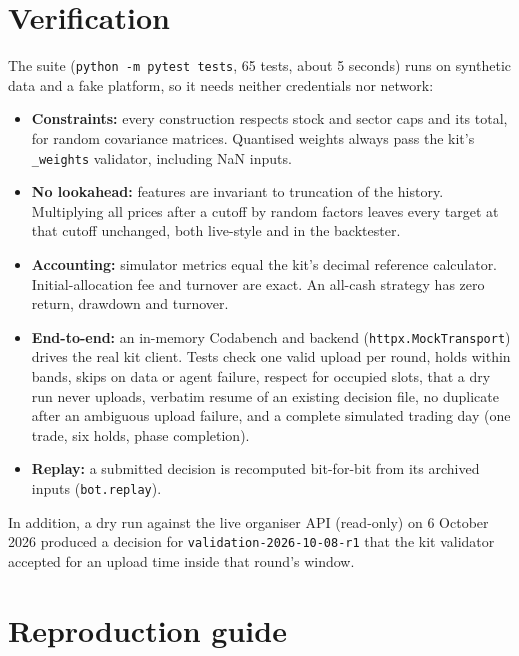 \documentclass[11pt,a4paper]{article}
\newcommand{\code}[1]{\texttt{#1}}
\begin{document}
\section{Verification}\label{sec:tests}

The suite (\code{python -m pytest tests}, 65 tests, about 5 seconds) runs on synthetic data and a fake platform, so it
needs neither credentials nor network:
\begin{itemize}[nosep]
  \item \textbf{Constraints:} every construction respects stock and sector caps and its total, for random covariance
        matrices. Quantised weights always pass the kit's \code{\_weights} validator, including NaN inputs.
  \item \textbf{No lookahead:} features are invariant to truncation of the history. Multiplying all prices after a
        cutoff by random factors leaves every target at that cutoff unchanged, both live-style and in the backtester.
  \item \textbf{Accounting:} simulator metrics equal the kit's decimal reference calculator. Initial-allocation fee and
        turnover are exact. An all-cash strategy has zero return, drawdown and turnover.
  \item \textbf{End-to-end:} an in-memory Codabench and backend (\code{httpx.MockTransport}) drives the real kit
        client. Tests check one valid upload per round, holds within bands, skips on data or agent failure, respect for
        occupied slots, that a dry run never uploads, verbatim resume of an existing decision file, no duplicate after an
        ambiguous upload failure, and a complete simulated trading day (one trade, six holds, phase completion).
  \item \textbf{Replay:} a submitted decision is recomputed bit-for-bit from its archived inputs (\code{bot.replay}).
\end{itemize}
In addition, a dry run against the live organiser API (read-only) on 6 October 2026 produced a decision for
\code{validation-2026-10-08-r1} that the kit validator accepted for an upload time inside that round's window.

\section{Reproduction guide}\label{sec:repro}
\end{document}
